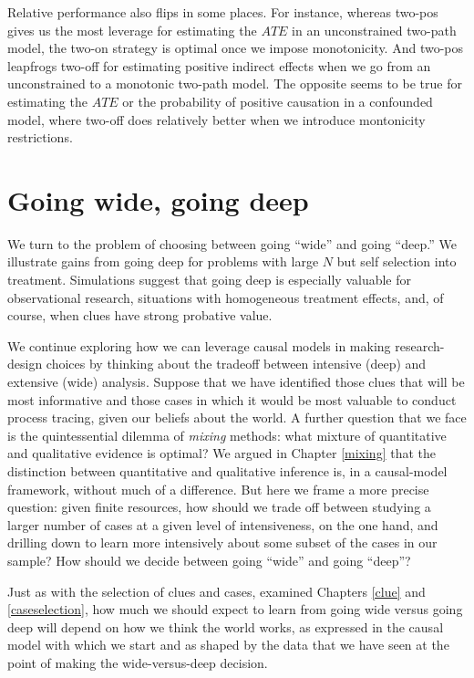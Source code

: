 \documentclass[
  12pt,
]{book}
\newenvironment{headerbox}{
  \definecolor{shadecolor}{rgb}{0.8, 0.8, 0.8}  %
  \color{black}
  \begin{shaded}}{\end{shaded}}
\begin{document}
Relative performance also flips in some places. For instance, whereas two-pos gives us the most leverage for estimating the \(ATE\) in an unconstrained two-path model, the two-on strategy is optimal once we impose monotonicity. And two-pos leapfrogs two-off for estimating positive indirect effects when we go from an unconstrained to a monotonic two-path model. The opposite seems to be true for estimating the \(ATE\) or the probability of positive causation in a confounded model, where two-off does relatively better when we introduce montonicity restrictions.

\hypertarget{wideordeep}{%
\chapter{Going wide, going deep}\label{wideordeep}}

\begin{headerbox}
We turn to the problem of choosing between going ``wide'' and going ``deep.'' We illustrate gains from going deep for problems with large \(N\) but self selection into treatment. Simulations suggest that going deep is especially valuable for observational research, situations with homogeneous treatment effects, and, of course, when clues have strong probative value.

\end{headerbox}

We continue exploring how we can leverage causal models in making research-design choices by thinking about the tradeoff between intensive (deep) and extensive (wide) analysis. Suppose that we have identified those clues that will be most informative and those cases in which it would be most valuable to conduct process tracing, given our beliefs about the world. A further question that we face is the quintessential dilemma of \emph{mixing} methods: what mixture of quantitative and qualitative evidence is optimal? We argued in Chapter \ref{mixing} that the distinction between quantitative and qualitative inference is, in a causal-model framework, without much of a difference. But here we frame a more precise question: given finite resources, how should we trade off between studying a larger number of cases at a given level of intensiveness, on the one hand, and drilling down to learn more intensively about some subset of the cases in our sample? How should we decide between going ``wide'' and going ``deep''?

Just as with the selection of clues and cases, examined Chapters \ref{clue} and \ref{caseselection}, how much we should expect to learn from going wide versus going deep will depend on how we think the world works, as expressed in the causal model with which we start and as shaped by the data that we have seen at the point of making the wide-versus-deep decision.
\end{document}
